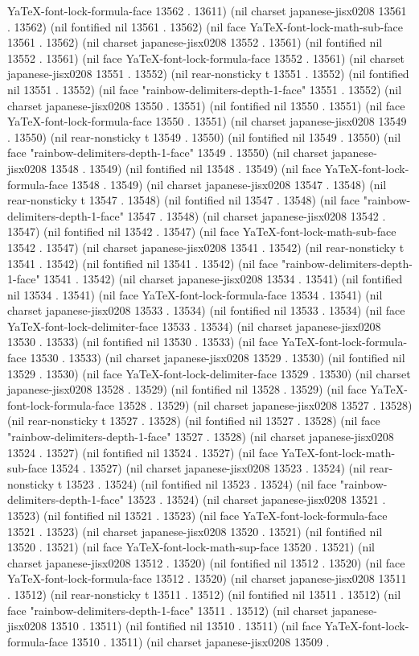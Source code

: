 YaTeX-font-lock-formula-face 13562 . 13611) (nil charset japanese-jisx0208 13561 . 13562) (nil fontified nil 13561 . 13562) (nil face YaTeX-font-lock-math-sub-face 13561 . 13562) (nil charset japanese-jisx0208 13552 . 13561) (nil fontified nil 13552 . 13561) (nil face YaTeX-font-lock-formula-face 13552 . 13561) (nil charset japanese-jisx0208 13551 . 13552) (nil rear-nonsticky t 13551 . 13552) (nil fontified nil 13551 . 13552) (nil face "rainbow-delimiters-depth-1-face" 13551 . 13552) (nil charset japanese-jisx0208 13550 . 13551) (nil fontified nil 13550 . 13551) (nil face YaTeX-font-lock-formula-face 13550 . 13551) (nil charset japanese-jisx0208 13549 . 13550) (nil rear-nonsticky t 13549 . 13550) (nil fontified nil 13549 . 13550) (nil face "rainbow-delimiters-depth-1-face" 13549 . 13550) (nil charset japanese-jisx0208 13548 . 13549) (nil fontified nil 13548 . 13549) (nil face YaTeX-font-lock-formula-face 13548 . 13549) (nil charset japanese-jisx0208 13547 . 13548) (nil rear-nonsticky t 13547 . 13548) (nil fontified nil 13547 . 13548) (nil face "rainbow-delimiters-depth-1-face" 13547 . 13548) (nil charset japanese-jisx0208 13542 . 13547) (nil fontified nil 13542 . 13547) (nil face YaTeX-font-lock-math-sub-face 13542 . 13547) (nil charset japanese-jisx0208 13541 . 13542) (nil rear-nonsticky t 13541 . 13542) (nil fontified nil 13541 . 13542) (nil face "rainbow-delimiters-depth-1-face" 13541 . 13542) (nil charset japanese-jisx0208 13534 . 13541) (nil fontified nil 13534 . 13541) (nil face YaTeX-font-lock-formula-face 13534 . 13541) (nil charset japanese-jisx0208 13533 . 13534) (nil fontified nil 13533 . 13534) (nil face YaTeX-font-lock-delimiter-face 13533 . 13534) (nil charset japanese-jisx0208 13530 . 13533) (nil fontified nil 13530 . 13533) (nil face YaTeX-font-lock-formula-face 13530 . 13533) (nil charset japanese-jisx0208 13529 . 13530) (nil fontified nil 13529 . 13530) (nil face YaTeX-font-lock-delimiter-face 13529 . 13530) (nil charset japanese-jisx0208 13528 . 13529) (nil fontified nil 13528 . 13529) (nil face YaTeX-font-lock-formula-face 13528 . 13529) (nil charset japanese-jisx0208 13527 . 13528) (nil rear-nonsticky t 13527 . 13528) (nil fontified nil 13527 . 13528) (nil face "rainbow-delimiters-depth-1-face" 13527 . 13528) (nil charset japanese-jisx0208 13524 . 13527) (nil fontified nil 13524 . 13527) (nil face YaTeX-font-lock-math-sub-face 13524 . 13527) (nil charset japanese-jisx0208 13523 . 13524) (nil rear-nonsticky t 13523 . 13524) (nil fontified nil 13523 . 13524) (nil face "rainbow-delimiters-depth-1-face" 13523 . 13524) (nil charset japanese-jisx0208 13521 . 13523) (nil fontified nil 13521 . 13523) (nil face YaTeX-font-lock-formula-face 13521 . 13523) (nil charset japanese-jisx0208 13520 . 13521) (nil fontified nil 13520 . 13521) (nil face YaTeX-font-lock-math-sup-face 13520 . 13521) (nil charset japanese-jisx0208 13512 . 13520) (nil fontified nil 13512 . 13520) (nil face YaTeX-font-lock-formula-face 13512 . 13520) (nil charset japanese-jisx0208 13511 . 13512) (nil rear-nonsticky t 13511 . 13512) (nil fontified nil 13511 . 13512) (nil face "rainbow-delimiters-depth-1-face" 13511 . 13512) (nil charset japanese-jisx0208 13510 . 13511) (nil fontified nil 13510 . 13511) (nil face YaTeX-font-lock-formula-face 13510 . 13511) (nil charset japanese-jisx0208 13509 . 